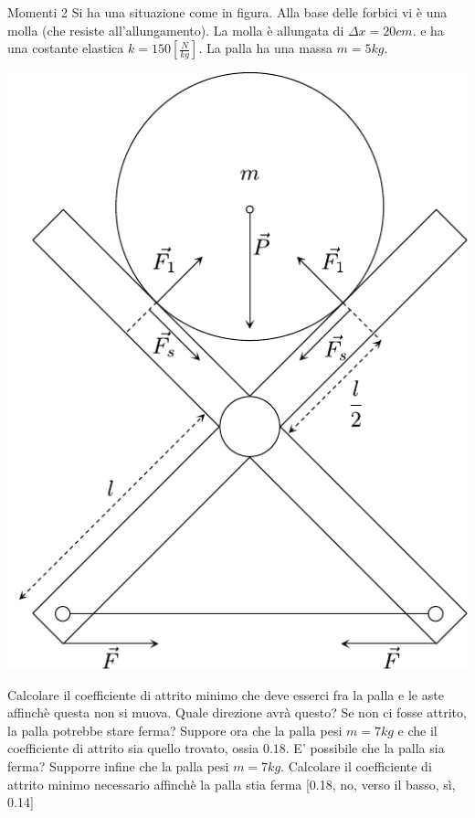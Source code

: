 \begin{esercizio}{Momenti 2}
	Si ha una situazione come in figura. Alla base delle forbici vi è una molla (che resiste all'allungamento). La molla è allungata di $ \Delta x = 20 cm  $. e ha una costante elastica $ k = 150 \left[\frac{N}{kg}\right] $. La palla ha una massa $ m  = 5 kg $.
	\begin{center}
		\includegraphics{Images/Momenti2.pdf }
	\end{center}
	Calcolare il coefficiente di attrito minimo che deve esserci fra la palla e le aste affinchè questa non si muova. Quale direzione avrà questo? Se non ci fosse attrito, la palla potrebbe stare ferma?
	\vskip3mm
	Suppore ora che la palla pesi $ m = 7 kg $ e che il coefficiente di attrito sia quello trovato, ossia $ 0.18 $. E' possibile che la palla sia ferma?
	\vskip3mm
	Supporre infine che la palla pesi $ m = 7kg $. Calcolare il coefficiente di attrito minimo necessario affinchè la palla stia ferma
	\vskip3mm
	\hfill [0.18, no, verso il basso, sì, 0.14]
\end{esercizio}
